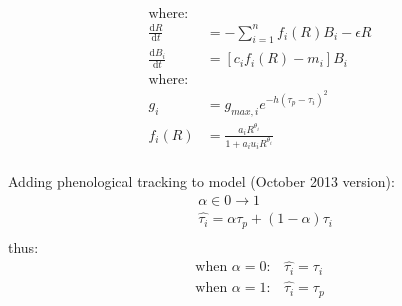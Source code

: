 \documentclass[11pt,letter]{article}
\begin{document}
 




\begin{align*}
\text{where:}\\
\frac{\mathrm{d}R}{\mathrm{d}t} & = - \sum_{i=1}^{n}f_{i}(R)B_{i} -\epsilon R
\\
\frac{\mathrm{d}B_{i}}{\mathrm{d}t} &  = [c_{i}f_{i}(R) - m_{i}]B_{i} 
\\
\text{where:} 
\\
g_{i} & = g_{max,i}e^{-h(\tau_{p}-\tau_{i})^2} 
\\
f_{i}(R) & = \frac{a_{i}R^{\theta_{i}}}{1+a_{i}u_{i}R^{\theta_{i}}}\\
\end{align*}

\noindent Adding phenological tracking to model (October 2013 version): \\
\begin{align*}
& \alpha \in 0 \rightarrow 1
\\
&\hat{\tau_{i}} = \alpha \tau_{p} + (1-\alpha)\tau_{i}\\
\end{align*}
\noindent thus:
\begin{align*}
\text{when } \alpha = 0: & \hat{\tau_{i}}=\tau_{i}
\\
\text{when }  \alpha = 1: & \hat{\tau_{i}}=\tau_{p}
\end{align*}
\end{document}
